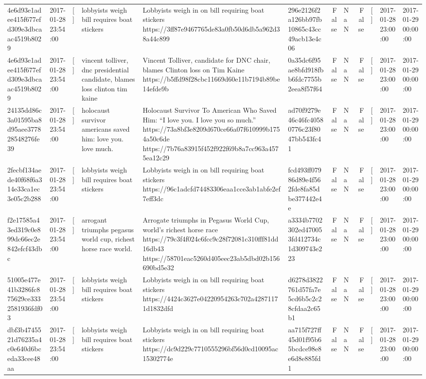 \begin{tabular}{llllllrlrlll}
4e6d93e1adee415f677efd309e3dbcaac4519b8029 & 2017-01-28 23:54:00 & [] & lobbyists weigh bill requires boat stickers & Lobbyists weigh in on bill requiring boat stickers https://3ff87e9467765de83a0fb50d6db5a962d38a44c899 & 296e2126f2a126bb97fb10865c43cc49acb13e4c06 & False & NaN & False & [] & 2017-01-28 23:00:00 & 2017-01-29 00:00:00 \\
4e6d93e1adee415f677efd309e3dbcaac4519b8029 & 2017-01-28 23:54:00 & [] & vincent tolliver, dnc presidential candidate, blames loss clinton tim kaine & Vincent Tolliver, candidate for DNC chair, blames Clinton loss on Tim Kaine https://b5ffd98f28cbc11669d60e11b7194b89be14efde9b & 0a35dc6f95ae8bfd918fbb6fdc7755b2eea8f57f64 & False & NaN & False & [] & 2017-01-28 23:00:00 & 2017-01-29 00:00:00 \\
24135dd86c3a01595ba8d95aee377828548276fe39 & 2017-01-28 23:54:00 & [] & holocaust survivor americans saved him: love you. love much. & Holocaust Survivor To American Who Saved Him: “I love you. I love you so much.” https://73a8bf3e8209d670ce66a07f610999b1754a50c6de https://7b76a83915f452f922f69b8a7cc963a4575ea12c29 & ad70f9279e46c46fc40580776c23f8047bb543fc41 & False & NaN & False & [] & 2017-01-28 23:00:00 & 2017-01-29 00:00:00 \\
2fecbf134aede40f68f6a314e33ca1ec3e05c2b288 & 2017-01-28 23:54:00 & [] & lobbyists weigh bill requires boat stickers & Lobbyists weigh in on bill requiring boat stickers https://96c1adcfd74483306eaa1cce3ab1abfe2ef7eff3dc & fcd493ff07986d89e4f562fde8fa85dbe377442e4e & False & NaN & False & [] & 2017-01-28 23:00:00 & 2017-01-29 00:00:00 \\
f2e17585a43ed319c0e899dc66ec2e842efcf43dbc & 2017-01-28 23:54:00 & [] & arrogant triumphs pegasus world cup, richest horse race world. & Arrogate triumphs in Pegasus World Cup, world's richest horse race https://79c3f4f024c6fcc9c28f72081c310fff81dd16db43 https://58701eac5260d405eec23ab5dbd02b156690bd5e32 & a3334b7702302ed470053fd412734c1d309743e223 & False & NaN & False & [] & 2017-01-28 23:00:00 & 2017-01-29 00:00:00 \\
51005e477e41b3286fc875629ce3332581936fdf03 & 2017-01-28 23:54:00 & [] & lobbyists weigh bill requires boat stickers & Lobbyists weigh in on bill requiring boat stickers https://4424c3627e04220954263c702a42871171d1832dfd & d6278d3822761d57fa7e5cd6b5c2c28cfdaa2c65b1 & False & NaN & False & [] & 2017-01-28 23:00:00 & 2017-01-29 00:00:00 \\
dbf3b4745521d76235a4c0e640d6bceda33cee48aa & 2017-01-28 23:54:00 & [] & lobbyists weigh bill requires boat stickers & Lobbyists weigh in on bill requiring boat stickers https://dc9d229c7710555296bf56d0cd10095ac15302774e & aa715f727ff45d01f95b65bcdce98e8e6d8e885fd1 & False & NaN & False & [] & 2017-01-28 23:00:00 & 2017-01-29 00:00:00 \\

\end{tabular}
